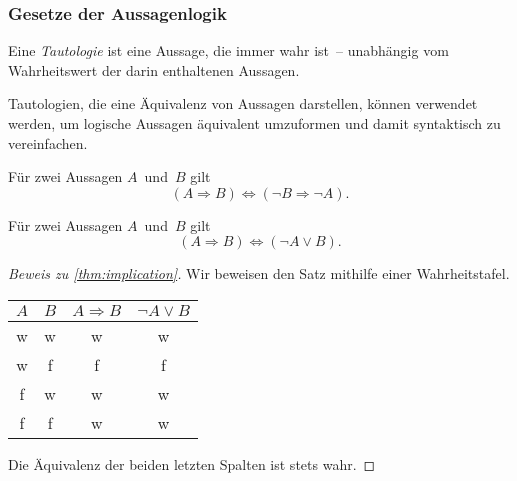 \documentclass[a4paper]{article}
\begin{document}
\subsubsection{Gesetze der Aussagenlogik}

\begin{definition}[Tautologie]
    Eine \emph{Tautologie} ist eine Aussage, die immer wahr ist~-- unabhängig vom Wahrheitswert der darin enthaltenen Aussagen.
\end{definition}

Tautologien, die eine Äquivalenz von Aussagen darstellen, können verwendet werden, um logische Aussagen äquivalent umzuformen und damit syntaktisch zu vereinfachen.

\begin{theorem}[Kontraposition]\label{thm:contraposition}
    Für zwei Aussagen $A$~und~$B$ gilt
    \begin{equation*}
        (A \Rightarrow B) \iff (\neg B \Rightarrow \neg A).
    \end{equation*}
\end{theorem}

\begin{theorem}\label{thm:implication}
    Für zwei Aussagen $A$~und~$B$ gilt
    \begin{equation*}
        (A \Rightarrow B) \iff (\neg A \vee B).
    \end{equation*}
\end{theorem}

\begin{proof}[Beweis zu \cref{thm:implication}]
    Wir beweisen den Satz mithilfe einer Wahrheitstafel.
    \begin{center}
        \begin{tabular}{cc@{\colsep}cc}\toprule
            $A$ & $B$ & $A \Rightarrow B$ & $\neg A \vee B$ \\\midrule
            w   & w   & w                 & w               \\
            w   & f   & f                 & f               \\
            f   & w   & w                 & w               \\
            f   & f   & w                 & w               \\\bottomrule
        \end{tabular}
    \end{center}
    Die Äquivalenz der beiden letzten Spalten ist stets wahr.
\end{proof}
\end{document}
